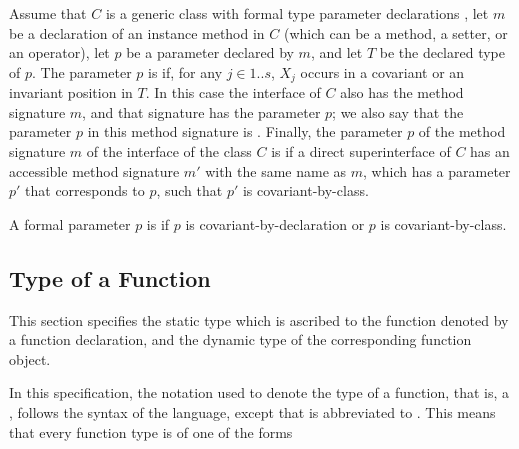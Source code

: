 \documentclass[makeidx]{article}
\begin{document}
\LMHash{}%
Assume that $C$ is a generic class
with formal type parameter declarations
,
%
let $m$ be a declaration of an instance method in $C$
(which can be a method, a setter, or an operator),
let $p$ be a parameter declared by $m$, and
let $T$ be the declared type of $p$.
%
The parameter $p$ is
if, for any $j \in 1 .. s$,
$X_j$ occurs in a covariant or an invariant position in $T$.
%
In this case the interface of $C$ also has the method signature $m$,
and that signature has the parameter $p$;
we also say that the parameter $p$ in this method signature is
.
Finally, the parameter $p$ of the method signature $m$
of the interface of the class $C$ is
if a direct superinterface of $C$
has an accessible method signature $m'$ with the same name as $m$,
which has a parameter $p'$ that corresponds to $p$,
such that $p'$ is covariant-by-class.

\LMHash{}%
A formal parameter $p$ is
if $p$ is covariant-by-declaration or $p$ is covariant-by-class.



\subsection{Type of a Function}

\LMHash{}%
This section specifies the static type which is ascribed to
the function denoted by a function declaration,
and the dynamic type of the corresponding function object.

\LMHash{}%
In this specification,
the notation used to denote the type of a function,
that is, a ,
follows the syntax of the language,
except that \EXTENDS{} is abbreviated to
\FunctionTypeExtends.
This means that every function type is of one of the forms
\end{document}
